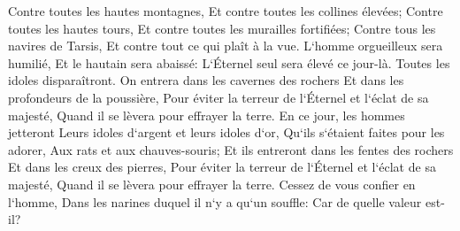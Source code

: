 \verse Contre toutes les hautes montagnes, Et contre toutes les collines élevées; 
\verse Contre toutes les hautes tours, Et contre toutes les murailles fortifiées; 
\verse Contre tous les navires de Tarsis, Et contre tout ce qui plaît à la vue. 
\verse L`homme orgueilleux sera humilié, Et le hautain sera abaissé: L`Éternel seul sera élevé ce jour-là. 
\verse Toutes les idoles disparaîtront. 
\verse On entrera dans les cavernes des rochers Et dans les profondeurs de la poussière, Pour éviter la terreur de l`Éternel et l`éclat de sa majesté, Quand il se lèvera pour effrayer la terre. 
\verse En ce jour, les hommes jetteront Leurs idoles d`argent et leurs idoles d`or, Qu`ils s`étaient faites pour les adorer, Aux rats et aux chauves-souris; 
\verse Et ils entreront dans les fentes des rochers Et dans les creux des pierres, Pour éviter la terreur de l`Éternel et l`éclat de sa majesté, Quand il se lèvera pour effrayer la terre. 
\verse Cessez de vous confier en l`homme, Dans les narines duquel il n`y a qu`un souffle: Car de quelle valeur est-il? 

